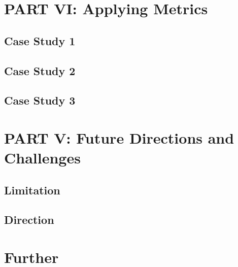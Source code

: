 \documentclass[
  letterpaper,
]{scrbook}
\begin{document}
\part{PART VI: Applying Metrics}

\chapter{Case Study 1}\label{case-study-1}

\chapter{Case Study 2}\label{case-study-2}

\chapter{Case Study 3}\label{case-study-3}

\part{PART V: Future Directions and Challenges}

\chapter{Limitation}\label{limitation}

\chapter{Direction}\label{direction}

\part{Further}


\backmatter
\end{document}
